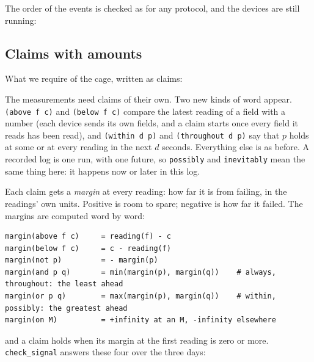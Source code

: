 

The order of the events is checked as for any protocol, and the devices are still running:


\subsection{Claims with amounts}

What we require of the cage, written as claims:



The measurements need claims of their own. Two new kinds of word appear.
\texttt{(above f c)} and \texttt{(below f c)} compare the latest reading of a field with a
number (each device sends its own fields, and a claim starts once every field it reads has been
read), and \texttt{(within d p)} and \texttt{(throughout d p)} say
that $p$ holds at some or at every reading in the next $d$ seconds. Everything else is as
before. A recorded log is one run, with one future, so \texttt{possibly} and
\texttt{inevitably} mean the same thing here: it happens now or later in this log.

Each claim gets a \emph{margin} at every reading: how far it is from failing, in the readings'
own units. Positive is room to spare; negative is how far it failed. The margins are computed
word by word:
\begin{lstlisting}[language={},basicstyle=\ttfamily\footnotesize]
margin(above f c)     = reading(f) - c
margin(below f c)     = c - reading(f)
margin(not p)         = - margin(p)
margin(and p q)       = min(margin(p), margin(q))    # always, throughout: the least ahead
margin(or p q)        = max(margin(p), margin(q))    # within, possibly: the greatest ahead
margin(on M)          = +infinity at an M, -infinity elsewhere
\end{lstlisting}
and a claim holds when its margin at the first reading is zero or more. \texttt{check\_signal}
answers these four over the three days:

\begin{center}
\small
{}
\end{center}

